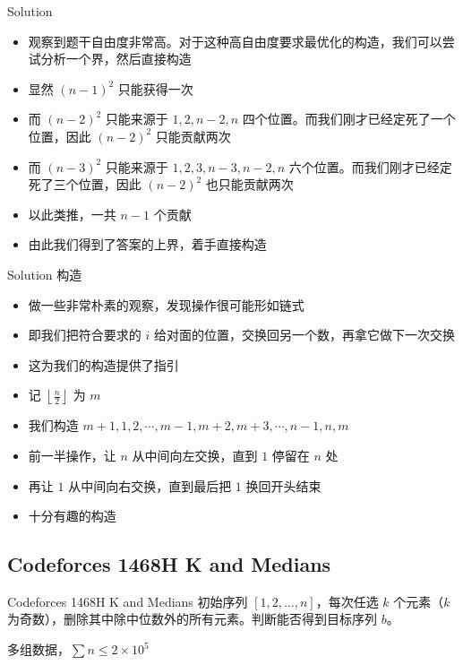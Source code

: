﻿\documentclass[aspectratio=169]{ctexbeamer}
\begin{document}
\begin{frame}{Solution}
    \begin{itemize}
        \item 观察到题干自由度非常高。对于这种高自由度要求最优化的构造，我们可以尝试分析一个界，然后直接构造
        \item 显然 $(n-1)^2$ 只能获得一次
        \item 而 $(n-2)^2$ 只能来源于 $1,2,n-2,n$ 四个位置。而我们刚才已经定死了一个位置，因此 $(n-2)^2$ 只能贡献两次
        \item 而 $(n-3)^2$ 只能来源于 $1,2,3,n-3,n-2,n$ 六个位置。而我们刚才已经定死了三个位置，因此 $(n-2)^2$ 也只能贡献两次
        \item 以此类推，一共 $n-1$ 个贡献
        \item 由此我们得到了答案的上界，着手直接构造
    \end{itemize}
\end{frame}

\begin{frame}{Solution}
    构造
    \begin{itemize}
        \item 做一些非常朴素的观察，发现操作很可能形如链式
        \item 即我们把符合要求的 $i$ 给对面的位置，交换回另一个数，再拿它做下一次交换
        \item 这为我们的构造提供了指引
        \item 记 $\left\lfloor\frac{n}{2}\right\rfloor$ 为 $m$
        \item 我们构造 $m+1,1,2,\cdots,m-1,m+2,m+3,\cdots,n-1,n,m$
        \item 前一半操作，让 $ n $ 从中间向左交换，直到 $ 1 $ 停留在 $ n $ 处
        \item 再让 $ 1 $ 从中间向右交换，直到最后把 $1$ 换回开头结束
        \item 十分有趣的构造
    \end{itemize}
\end{frame}


\subsection{Codeforces 1468H K and Medians}
\begin{frame}{Codeforces 1468H K and Medians}
    初始序列 $[1,2,\dots,n]$，每次任选 $k$ 个元素（$k$ 为奇数），删除其中除中位数外的所有元素。判断能否得到目标序列 $b$。
    
    多组数据，$\sum n\le 2\times10^5$
\end{frame}
\end{document}
